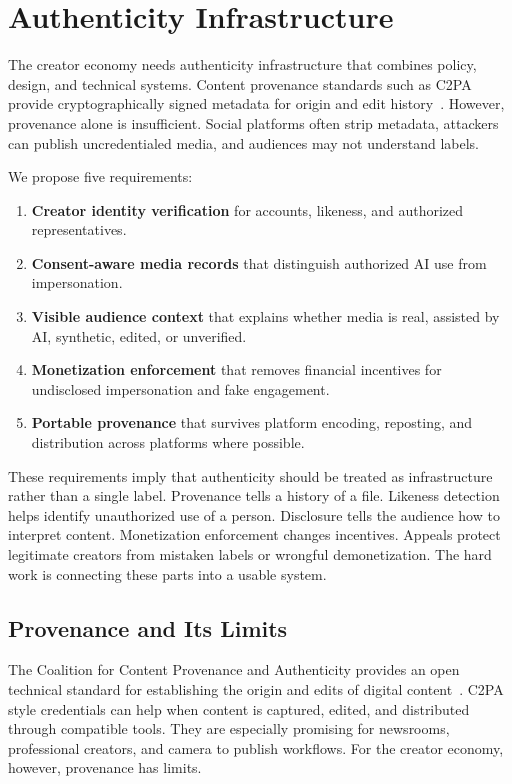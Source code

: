 \documentclass[11pt]{article}
\begin{document}
\section{Authenticity Infrastructure}

The creator economy needs authenticity infrastructure that combines policy, design, and technical systems. Content provenance standards such as C2PA provide cryptographically signed metadata for origin and edit history~\cite{c2pa2026}. However, provenance alone is insufficient. Social platforms often strip metadata, attackers can publish uncredentialed media, and audiences may not understand labels.

We propose five requirements:

\begin{enumerate}[leftmargin=*]
  \item \textbf{Creator identity verification} for accounts, likeness, and authorized representatives.
  \item \textbf{Consent-aware media records} that distinguish authorized AI use from impersonation.
  \item \textbf{Visible audience context} that explains whether media is real, assisted by AI, synthetic, edited, or unverified.
  \item \textbf{Monetization enforcement} that removes financial incentives for undisclosed impersonation and fake engagement.
  \item \textbf{Portable provenance} that survives platform encoding, reposting, and distribution across platforms where possible.
\end{enumerate}

These requirements imply that authenticity should be treated as infrastructure rather than a single label. Provenance tells a history of a file. Likeness detection helps identify unauthorized use of a person. Disclosure tells the audience how to interpret content. Monetization enforcement changes incentives. Appeals protect legitimate creators from mistaken labels or wrongful demonetization. The hard work is connecting these parts into a usable system.

\subsection{Provenance and Its Limits}

The Coalition for Content Provenance and Authenticity provides an open technical standard for establishing the origin and edits of digital content~\cite{c2pa2026}. C2PA style credentials can help when content is captured, edited, and distributed through compatible tools. They are especially promising for newsrooms, professional creators, and camera to publish workflows. For the creator economy, however, provenance has limits.
\end{document}
